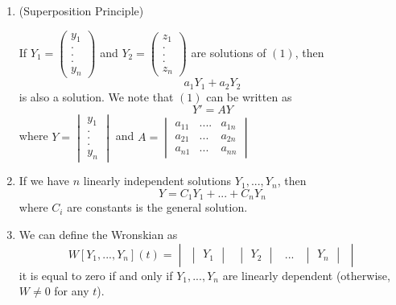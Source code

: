 \documentclass[11pt]{article}
\theoremstyle{plain} %
\theoremstyle{definition}
\theoremstyle{example}
\theoremstyle{remark}
\begin{document}
\begin{enumerate}
\item (Superposition Principle)

 If $Y_1 = \begin{pmatrix}y_1\\.\\.\\.\\y_n\end{pmatrix}$ and $Y_2 = \begin{pmatrix}z_1\\.\\.\\.\\z_n\end{pmatrix}$ are solutions of $(1)$, then $$a_1Y_1 + a_2Y_2$$ is also a solution. We note that $(1)$ can be written as $$Y' = AY$$ where $Y = \begin{vmatrix}y_1\\.\\.\\.\\y_n\end{vmatrix}$ and $A = \begin{vmatrix}a_{11} & .... & a_{1n}\\ a_{21} & ... & a_{2n} \\a_{n1} & ... & a_{nn}\end{vmatrix}$
 \item If we have $n$ linearly independent solutions $Y_1, ..., Y_n$, then $$Y = C_1Y_1 + ... + C_nY_n$$ where $C_i$ are constants is the general solution.
 \item We can define the Wronskian as $$W[Y_1, ..., Y_n] (t) =  \begin{vmatrix}
 	\begin{vmatrix}Y_1\end{vmatrix} & \begin{vmatrix}Y_2\end{vmatrix} & ... &\begin{vmatrix}Y_n\end{vmatrix}
 \end{vmatrix}$$ it is equal to zero if and only if $Y_1, ..., Y_n$ are linearly dependent (otherwise, $W \neq 0$ for any $t$).
\end{enumerate}
\end{document}
